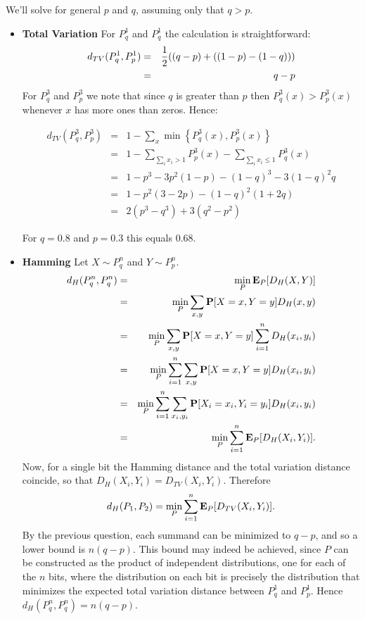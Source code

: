 \documentclass[11pt]{article} \usepackage{amssymb}
\newcommand{\E}{{\bf E}} \newcommand{\Cov}{{\bf Cov}}
\begin{document}
We'll solve for general $p$ and $q$, assuming only that $q>p$.
\begin{itemize}
\item {\bf Total Variation}
For $P_q^1$ and $P_q^1$ the calculation is straightforward:
\begin{eqnarray*}
  d_{TV}(P_q^1,P_p^1)&=&{1\over 2}((q-p)+((1-p)-(1-q)))
  \\ &=& q-p
\end{eqnarray*}
For $P_q^3$ and $P_p^3$ we note that since $q$ is greater than $p$ then
$P_q^3(x)>P_p^3(x)$ whenever $x$ has more ones than zeros. Hence:

\begin{eqnarray*}
  d_{TV}(P_q^3,P_p^3)&=&1-\sum_{x}\min\left\{P_q^3(x),P_p^3(x)\right\}
\\ &=& 1-\sum_{\sum_ix_i>1}P_p^3(x)-\sum_{\sum_ix_i\leq 1}P_q^3(x)
\\ &=& 1-p^3-3p^2(1-p)-(1-q)^3-3(1-q)^2q
\\ &=& 1-p^2(3-2p)-(1-q)^2(1+2q)
\\ &=& 2(p^3-q^3)+3(q^2-p^2)
\end{eqnarray*}

For $q=0.8$ and $p=0.3$ this equals 0.68.

\item {\bf Hamming}
Let $X\sim P_q^n$ and $Y\sim P_p^n$.
\begin{eqnarray*}
  d_H(P_q^n,P_q^n)&=&\min_P\E_P[D_H(X,Y)]
  \\   &=& \min_P\sum_{x,y}\P[X=x,Y=y]D_H(x,y)
  \\ &=& \min_P\sum_{x,y}\P[X=x,Y=y]\sum_{i=1}^nD_H(x_i,y_i)
  \\ &=& \min_P\sum_{i=1}^n\sum_{x,y}\P[X=x,Y=y]D_H(x_i,y_i)
  \\ &=& \min_P\sum_{i=1}^n\sum_{x_i,y_i}\P[X_i=x_i,Y_i=y_i]D_H(x_i,y_i)
  \\ &=& \min_P\sum_{i=1}^n\E_P[D_H(X_i,Y_i)].
\end{eqnarray*}
Now, for a single bit the Hamming distance and the total variation distance
coincide, so that $D_H(X_i,Y_i)=D_{TV}(X_i,Y_i)$. Therefore
\begin{eqnarray*}
  d_H(P_1,P_2)=\min_P\sum_{i=1}^n\E_P[D_{TV}(X_i,Y_i)].
\end{eqnarray*}
By the previous question, each summand can be minimized to $q-p$, and so a
lower bound is $n(q-p)$. This bound may indeed be achieved, since $P$ can
be constructed as the product of independent distributions, one for each of the
$n$ bits, where the distribution on each bit is precisely the distribution that
minimizes the expected total variation distance between $P_q^1$ and $P_p^1$.
Hence
$d_H(P_q^n,P_q^n)=n(q-p)$.

\end{itemize}
\end{document}
